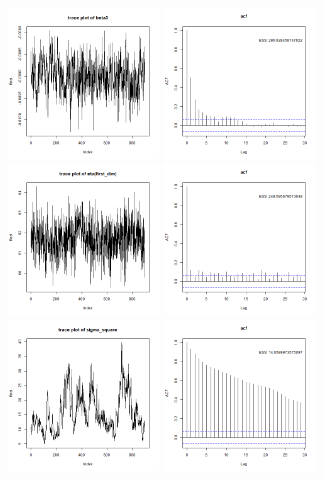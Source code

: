 \documentclass{article}
\begin{document}
\begin{figure}[!h]
    \includegraphics[width=4cm]{prob2_beta3_traceplot.png}
    \includegraphics[width=4cm]{prob2_beta3_acf.png}\\
    \includegraphics[width=4cm]{prob2_eta(first_dim)_traceplot.png}
    \includegraphics[width=4cm]{prob2_eta(first_dim)_acf.png}
    \includegraphics[width=4cm]{prob2_sigma_square_traceplot.png}
    \includegraphics[width=4cm]{prob2_sigma_square_acf.png}\\

\end{figure}
\end{document}
